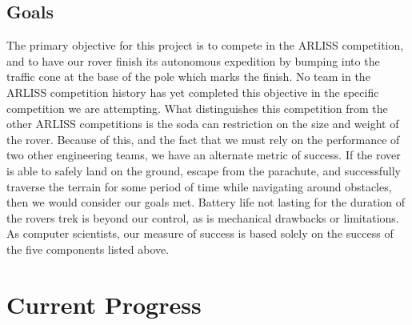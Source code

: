\documentclass[10pt,letterpaper,onecolumn,draftclsnofoot,journal]{IEEEtran}
\begin{document}
\subsection{\textbf{Goals}}
The primary objective for this project is to compete in the ARLISS competition, and to have our rover finish its autonomous expedition by bumping into the traffic cone at the base of the pole which marks the finish. No team in the ARLISS competition history has yet completed this objective in the specific competition we are attempting. What distinguishes this competition from the other ARLISS competitions is the soda can restriction on the size and weight of the rover. Because of this, and the fact that we must rely on the performance of two other engineering teams, we have an alternate metric of success. If the rover is able to safely land on the ground, escape from the parachute, and successfully traverse the terrain for some period of time while navigating around obstacles, then we would consider our goals met. Battery life not lasting for the duration of the rovers trek is beyond our control, as is mechanical drawbacks or limitations. As computer scientists, our measure of success is based solely on the success of the five components listed above.

\section{\textbf{Current Progress}}
\end{document}
